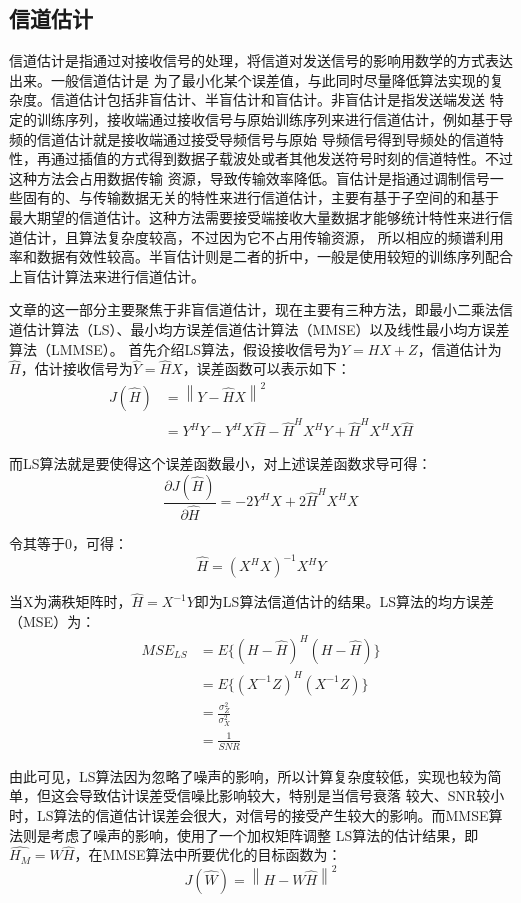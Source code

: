 \documentclass[12pt, a4paper, oneside]{ctexart}
\begin{document}
\subsection*{\heiti{} 信道估计}
\songti 信道估计是指通过对接收信号的处理，将信道对发送信号的影响用数学的方式表达出来。一般信道估计是
为了最小化某个误差值，与此同时尽量降低算法实现的复杂度。信道估计包括非盲估计、半盲估计和盲估计。非盲估计是指发送端发送
特定的训练序列，接收端通过接收信号与原始训练序列来进行信道估计，例如基于导频的信道估计就是接收端通过接受导频信号与原始
导频信号得到导频处的信道特性，再通过插值的方式得到数据子载波处或者其他发送符号时刻的信道特性。不过这种方法会占用数据传输
资源，导致传输效率降低。盲估计是指通过调制信号一些固有的、与传输数据无关的特性来进行信道估计，主要有基于子空间的和基于
最大期望的信道估计。这种方法需要接受端接收大量数据才能够统计特性来进行信道估计，且算法复杂度较高，不过因为它不占用传输资源，
所以相应的频谱利用率和数据有效性较高。半盲估计则是二者的折中，一般是使用较短的训练序列配合上盲估计算法来进行信道估计。

文章的这一部分主要聚焦于非盲信道估计，现在主要有三种方法，即最小二乘法信道估计算法（LS）、最小均方误差信道估计算法（MMSE）以及线性最小均方误差算法（LMMSE）。
首先介绍LS算法，假设接收信号为$Y=HX+Z$，信道估计为$\widehat{H}$，估计接收信号为$\widehat{Y}=\widehat{H}X$，误差函数可以表示如下：
$$
\begin{aligned}
    J(\widehat{H}) &=\left\| Y-\widehat{H}X \right\|^2 \\
    &=Y^HY-Y^HX\widehat{H}-\widehat{H}^HX^HY+\widehat{H}^HX^HX\widehat{H}
\end{aligned}
$$

而LS算法就是要使得这个误差函数最小，对上述误差函数求导可得：
$$
\dfrac{\partial J(\widehat{H})}{\partial\widehat{H}}=-2Y^HX+2\widehat{H}^HX^HX
$$

令其等于0，可得：
$$
\widehat{H}=(X^HX)^{-1}X^HY
$$

当X为满秩矩阵时，$\widehat{H}=X^{-1}Y$即为LS算法信道估计的结果。LS算法的均方误差（MSE）为：
$$
\begin{aligned}
    MSE_{LS} &=E\{(H-\widehat{H})^H(H-\widehat{H})\} \\
    &=E\{(X^{-1}Z)^H(X^{-1}Z)\} \\
    &=\frac{\sigma_Z^2}{\sigma_X^2} \\
    &=\frac{1}{SNR}
\end{aligned}
$$

由此可见，LS算法因为忽略了噪声的影响，所以计算复杂度较低，实现也较为简单，但这会导致估计误差受信噪比影响较大，特别是当信号衰落
较大、SNR较小时，LS算法的信道估计误差会很大，对信号的接受产生较大的影响。而MMSE算法则是考虑了噪声的影响，使用了一个加权矩阵调整
LS算法的估计结果，即$\widehat{H_M}=W\widehat{H}$，在MMSE算法中所要优化的目标函数为：
$$
J(\widehat{W})=\left\| H-W\widehat{H} \right\|^2
$$
\end{document}

